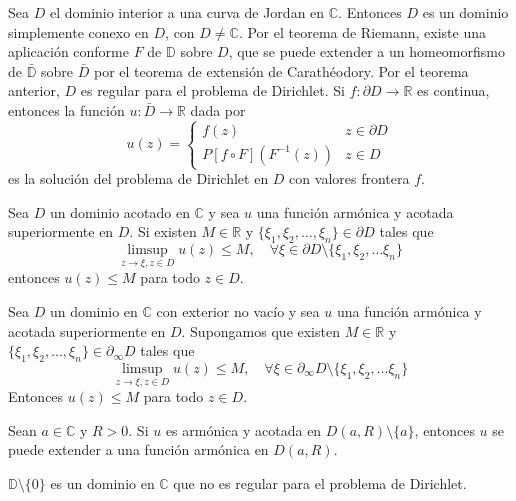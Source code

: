 Sea $D$ el dominio interior a una curva de Jordan en $\mathbb{C}$.
Entonces $D$ es un dominio simplemente conexo en $D$, con $D \neq \mathbb{C}$.
Por el teorema de Riemann, existe una aplicación conforme $F$ de $\mathbb{D}$ sobre $D$, que se puede extender a un homeomorfismo de $\bar{\mathbb{D}}$ sobre $\bar{D}$ por el teorema de extensión de Carathéodory.
Por el teorema anterior, $D$ es regular para el problema de Dirichlet.
Si $f: \partial D \to \mathbb{R}$ es continua, entonces la función $u: \bar{D} \to \mathbb{R}$ dada por
$$u(z) = \begin{cases}
        f(z)                    & z \in \partial D \\
        P[f \circ F](F^{-1}(z)) & z \in D
    \end{cases}$$
es la solución del problema de Dirichlet en $D$ con valores frontera $f$.

\begin{theorem}
    Sea $D$ un dominio acotado en $\mathbb{C}$ y sea $u$ una función armónica y acotada superiormente en $D$.
    Si existen $M \in \mathbb{R}$ y $\{\xi_1, \xi_2, \dots, \xi_n\} \in \partial D$ tales que
    $$\limsup_{z \to \xi, z \in D} u(z) \leq M, \quad \forall \xi \in \partial D \setminus \{\xi_1, \xi_2, \dots \xi_n\}$$
    entonces $u(z) \leq M$ para todo $z \in D$.
\end{theorem}


\begin{theorem}
    Sea $D$ un dominio en $\mathbb{C}$ con exterior no vacío y sea $u$ una función armónica y acotada superiormente en $D$.
    Supongamos que existen $M \in \mathbb{R}$ y $\{\xi_1, \xi_2, \dots, \xi_n\} \in \partial_\infty D$ tales que
    $$\limsup_{z \to \xi, z \in D} u(z) \leq M, \quad \forall \xi \in \partial_\infty D \setminus \{\xi_1, \xi_2, \dots \xi_n\}$$
    Entonces $u(z) \leq M$ para todo $z \in D$.
\end{theorem}


\begin{theorem}
    Sean $a \in \mathbb{C}$ y $R > 0$.
    Si $u$ es armónica y acotada en $D(a, R) \setminus \{a\}$, entonces $u$ se puede extender a una función armónica en $D(a, R)$.
\end{theorem}


\begin{theorem}
    $\mathbb{D} \setminus \{0\}$ es un dominio en $\mathbb{C}$ que no es regular para el problema de Dirichlet.
\end{theorem}


